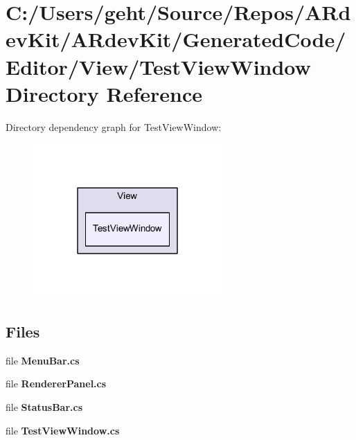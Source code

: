 \section{C\-:/\-Users/geht/\-Source/\-Repos/\-A\-Rdev\-Kit/\-A\-Rdev\-Kit/\-Generated\-Code/\-Editor/\-View/\-Test\-View\-Window Directory Reference}
\label{dir_236c2c4bed4683df2c29f16a305ab173}
Directory dependency graph for Test\-View\-Window\-:
\nopagebreak
\begin{figure}[H]
\begin{center}
\leavevmode
\includegraphics[width=204pt]{dir_236c2c4bed4683df2c29f16a305ab173_dep}
\end{center}
\end{figure}
\subsection*{Files}
\begin{DoxyCompactItemize}
\item 
file {\bfseries Menu\-Bar.\-cs}
\item 
file {\bfseries Renderer\-Panel.\-cs}
\item 
file {\bfseries Status\-Bar.\-cs}
\item 
file {\bfseries Test\-View\-Window.\-cs}
\end{DoxyCompactItemize}

